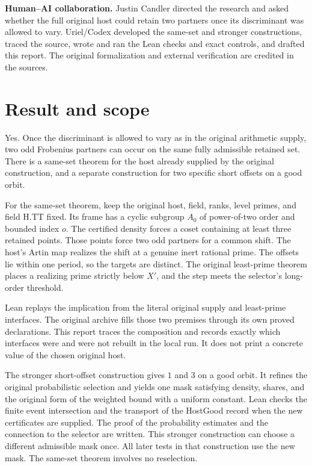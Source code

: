 \documentclass[12pt,letterpaper]{article}
\DeclareRobustCommand{\id}[1]{\mbox{\small\ttfamily #1}}
\begin{document}
\medskip
\textbf{Human--AI collaboration.} Justin Candler directed the research and asked whether the full original host could retain two partners once its discriminant was allowed to vary. Uriel/Codex developed the same-set and stronger constructions, traced the source, wrote and ran the Lean checks and exact controls, and drafted this report. The original formalization and external verification are credited in the sources.
\clearpage
\begingroup\small\setlength{\parskip}{0pt}\tableofcontents\endgroup
\clearpage
{}
\section{Result and scope}
\label{sec:result}

Yes. Once the discriminant is allowed to vary as in the original arithmetic supply, two odd Frobenius partners can occur on the same fully admissible retained set. There is a same-set theorem for the host already supplied by the original construction, and a separate construction for two specific short offsets on a good orbit.

For the same-set theorem, keep the original host, field, ranks, level primes, and field \id{H.TT} fixed. Its frame has a cyclic subgroup \(A_0\) of power-of-two order and bounded index \(o\). The certified density forces a coset containing at least three retained points. Those points force two odd partners for a common shift. The host's Artin map realizes the shift at a genuine inert rational prime. The offsets lie within one period, so the targets are distinct. The original least-prime theorem places a realizing prime strictly below \(X'\), and the step meets the selector's long-order threshold.

Lean replays the implication from the literal original supply and least-prime interfaces. The original archive fills those two premises through its own proved declarations. This report traces the composition and records exactly which interfaces were and were not rebuilt in the local run. It does not print a concrete value of the chosen original host.

The stronger short-offset construction gives \(1\) and \(3\) on a good orbit. It refines the original probabilistic selection and yields one mask satisfying density, shares, and the original form of the weighted bound with a uniform constant. Lean checks the finite event intersection and the transport of the \id{HostGood} record when the new certificates are supplied. The proof of the probability estimates and the connection to the selector are written. This stronger construction can choose a different admissible mask once. All later tests in that construction use the new mask. The same-set theorem involves no reselection.
\end{document}
